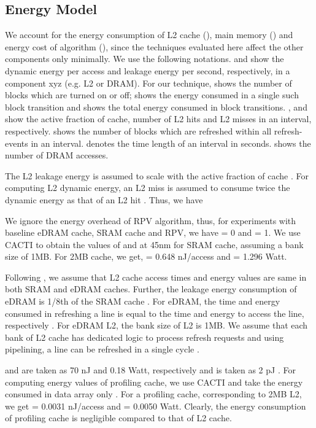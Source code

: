  
 \subsection{Energy Model}\label{sec:energymodel}
We account for the energy consumption of L2 cache (), main memory () and energy cost of algorithm (), since the techniques evaluated here affect the other components only minimally. We use the following notations.  and  show the dynamic energy per access and leakage energy per second, respectively, in a component xyz (e.g. L2 or DRAM). For our technique,  shows the number of blocks which are turned on or off;  shows the energy consumed in a single such block transition and  shows the total energy consumed in block transitions. ,   and  show the active fraction of cache, number of L2 hits and L2 misses in an interval,  respectively.   shows the number of blocks which are refreshed within all refresh-events in an interval.  denotes the time length of an interval in seconds.  shows the number of DRAM accesses.  

The L2 leakage energy is assumed to scale with the active fraction of cache 
\cite{mittal2013PhDThesis}. For computing L2 dynamic energy, an L2 miss is 
assumed to consume twice the dynamic energy as that of an L2 hit 
\cite{mittal2013PhDThesis}.  Thus, we have 



We ignore the energy overhead of RPV algorithm, thus, for experiments with 
baseline eDRAM cache, SRAM cache and RPV, we have  = 0 and  = 1. 
We use CACTI \cite{cacti_53} to obtain the values of  and 
  at 45nm for SRAM cache, assuming a bank size of 1MB. For 2MB 
cache, we get,  = 0.648 nJ/access and   = 1.296 
Watt. 



Following \cite{agrawalrefrint}, we assume that L2 cache access times and energy 
values are same in both SRAM and eDRAM caches. Further, the leakage energy 
consumption of eDRAM is 1/8th of the SRAM cache 
\cite{iyer2005embedded,agrawalrefrint}. For eDRAM, the time and energy consumed 
in refreshing a line is equal to the time and energy to access the line, 
respectively \cite{agrawalrefrint}. For eDRAM L2, the bank size of L2 is 1MB. We 
assume that each bank of L2 cache  has dedicated logic to process refresh 
requests and using pipelining, a line can be refreshed in a single cycle 
\cite{agrawalrefrint}. 

  and  are taken as 70 nJ and 0.18 Watt, 
respectively \cite{mittal2013PhDThesis} and  is taken 
as 2 pJ \cite{mittal2013PhDThesis}. For computing energy values of profiling 
cache, we use CACTI and take the energy consumed in data array only 
\cite{mittal2013PhDThesis}. For a profiling cache, corresponding to 2MB L2, we 
get  = 0.0031 nJ/access and   = 0.0050 Watt. 
Clearly, the energy consumption of profiling cache is negligible compared to 
that of L2 cache. 


